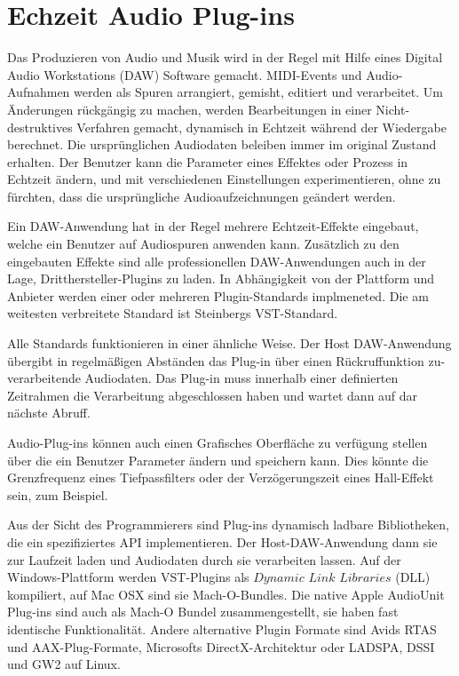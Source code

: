\section{Echzeit Audio Plug-ins}

Das Produzieren von Audio und Musik wird in der Regel mit Hilfe eines Digital Audio Workstations (DAW) Software gemacht. MIDI-Events und Audio-Aufnahmen werden als Spuren arrangiert, gemisht, editiert und verarbeitet. Um Änderungen rückgängig zu machen, werden Bearbeitungen in einer Nicht-destruktives Verfahren gemacht, dynamisch in Echtzeit während der Wiedergabe berechnet. Die ursprünglichen Audiodaten beleiben immer im original Zustand erhalten. Der Benutzer kann die Parameter eines Effektes oder Prozess in Echtzeit ändern, und mit verschiedenen Einstellungen experimentieren, ohne zu fürchten, dass die ursprüngliche Audioaufzeichnungen geändert werden.

Ein DAW-Anwendung hat in der Regel mehrere Echtzeit-Effekte eingebaut, welche ein Benutzer auf Audiospuren anwenden kann. Zusätzlich zu den eingebauten Effekte sind alle professionellen DAW-Anwendungen auch in der Lage, Dritthersteller-Plugins zu laden. In Abhängigkeit von der Plattform und Anbieter werden einer oder mehreren Plugin-Standards implmeneted. Die am weitesten verbreitete Standard ist Steinbergs VST-Standard.

Alle Standards funktionieren in einer ähnliche Weise. Der Host DAW-Anwendung übergibt in regelmäßigen Abständen das Plug-in über einen Rückruffunktion zu-verarbeitende Audiodaten. Das Plug-in muss innerhalb einer definierten Zeitrahmen die Verarbeitung abgeschlossen haben und wartet dann auf dar nächste Abruff.

Audio-Plug-ins können auch einen Grafisches Oberfläche zu verfügung stellen über die ein Benutzer Parameter ändern und speichern kann. Dies könnte die Grenzfrequenz eines Tiefpassfilters oder der Verzögerungszeit eines Hall-Effekt sein, zum Beispiel.

Aus der Sicht des Programmierers sind Plug-ins dynamisch ladbare Bibliotheken, die ein spezifiziertes API implementieren. Der Host-DAW-Anwendung dann sie zur Laufzeit laden und Audiodaten durch sie verarbeiten lassen\cite{realtime-architectures}. Auf der Windows-Plattform werden VST-Plugins als \(Dynamic\) \(Link\) \(Libraries\) (DLL) kompiliert, auf Mac OSX sind sie Mach-O-Bundles. Die native Apple AudioUnit Plug-ins sind auch als Mach-O Bundel zusammengestellt, sie haben fast identische Funktionalität. Andere alternative Plugin Formate sind Avids RTAS und AAX-Plug-Formate, Microsofts DirectX-Architektur oder LADSPA, DSSI und GW2 auf Linux.

